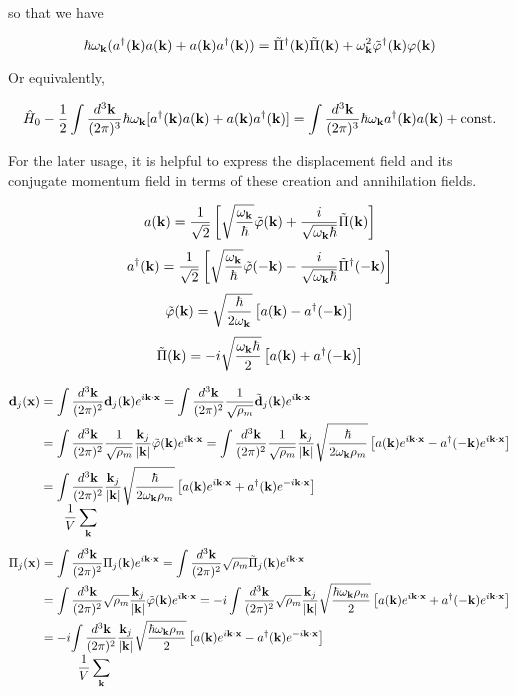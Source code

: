 so that we have

\[\hbar\omega_{\bf k}(a^\dagger({\bf k})a({\bf k}) + a({\bf k})a^\dagger({\bf k})) = \tilde\Pi^\dagger({\bf k})\tilde\Pi({\bf k}) + \omega_{\bf k}^2\tilde\varphi^\dagger({\bf k})\varphi({\bf k}) \]

Or equivalently,

\[\hat{H}_0 - \frac{1}{2}\int\frac{d^3\bf k}{(2\pi)^3}\hbar\omega_{\bf k}[a^\dagger({\bf k})a({\bf k}) + a({\bf k})a^\dagger({\bf k})] = \int\frac{d^3\bf k}{(2\pi)^3}\hbar\omega_{\bf k}a^\dagger({\bf k})a({\bf k}) + \text{const.} \]

For the later usage, it is helpful to express the displacement field and its conjugate momentum field in terms of these creation and annihilation fields.

\[a({\bf k}) = \frac{1}{\sqrt{2}}\left[\sqrt{\frac{\omega_{\bf k}}{\hbar}}\tilde\varphi({\bf k}) + \frac{i}{\sqrt{\omega_{\bf k}\hbar}}\tilde\Pi({\bf k})\right] \]
\[a^\dagger({\bf k}) = \frac{1}{\sqrt{2}}\left[\sqrt{\frac{\omega_{\bf k}}{\hbar}}\tilde\varphi({\bf -k}) - \frac{i}{\sqrt{\omega_{\bf k}\hbar}}\tilde\Pi^\dagger({\bf -k})\right] \]
\[\tilde\varphi({\bf k}) = \sqrt{\frac{\hbar}{2\omega_{\bf k}}}\left[a({\bf k}) - a^\dagger({-\bf k})\right] \]
\[\tilde\Pi({\bf k}) = -i\sqrt{\frac{\omega_{\bf k}\hbar}{2}}\left[a({\bf k}) + a^\dagger({-\bf k})\right] \]

\[\begin{split}
{\bf d}_j({\bf x}) &= \int\frac{d^3\bf k}{(2\pi)^2} {\bf d}_j({\bf k})e^{i\bf k\cdot x} = \int\frac{d^3\bf k}{(2\pi)^2}\frac{1}{\sqrt{\rho_m}}\tilde{\bf d}_j({\bf k})e^{i\bf k\cdot x}\\
&=\int\frac{d^3\bf k}{(2\pi)^2}\frac{1}{\sqrt{\rho_m}}\frac{{\bf k}_j}{|{\bf k}|}\tilde\varphi({\bf k})e^{i\bf k\cdot x} = \int\frac{d^3\bf k}{(2\pi)^2}\frac{1}{\sqrt{\rho_m}}\frac{{\bf k}_j}{|{\bf k}|}\sqrt{\frac{\hbar}{2\omega_{\bf k}\rho_m}}\left[a({\bf k})e^{i\bf k\cdot x}-a^\dagger(-{\bf k})e^{i\bf k\cdot x}\right]\\
&=\underset{\displaystyle\frac{1}{V}\sum_{\bf k}}{\int\frac{d^3\bf k}{(2\pi)^2}}\frac{{\bf k}_j}{|{\bf k}|}\sqrt{\frac{\hbar}{2\omega_{\bf k}\rho_m}}\left[a({\bf k})e^{i\bf k\cdot x}+a^\dagger({\bf k})e^{-i\bf k\cdot x}\right]
\end{split}\]
\[\begin{split}
\Pi_j({\bf x}) &= \int\frac{d^3\bf k}{(2\pi)^2} {\Pi}_j({\bf k})e^{i\bf k\cdot x} = \int\frac{d^3\bf k}{(2\pi)^2}\sqrt{\rho_m}\tilde{\Pi}_j({\bf k})e^{i\bf k\cdot x}\\
&=\int\frac{d^3\bf k}{(2\pi)^2}\sqrt{\rho_m}\frac{{\bf k}_j}{|{\bf k}|}\tilde\varphi({\bf k})e^{i\bf k\cdot x} = -i\int\frac{d^3\bf k}{(2\pi)^2}\sqrt{\rho_m}\frac{{\bf k}_j}{|{\bf k}|}\sqrt{\frac{\hbar\omega_{\bf k}\rho_m}{2}}\left[a({\bf k})e^{i\bf k\cdot x}+a^\dagger(-{\bf k})e^{i\bf k\cdot x}\right]\\
&=-i\underset{\displaystyle\frac{1}{V}\sum_{\bf k}}{\int\frac{d^3\bf k}{(2\pi)^2}}\frac{{\bf k}_j}{|{\bf k}|}\sqrt{\frac{\hbar\omega_{\bf k}\rho_m}{2}}\left[a({\bf k})e^{i\bf k\cdot x}-a^\dagger({\bf k})e^{-i\bf k\cdot x}\right]
\end{split}\]

